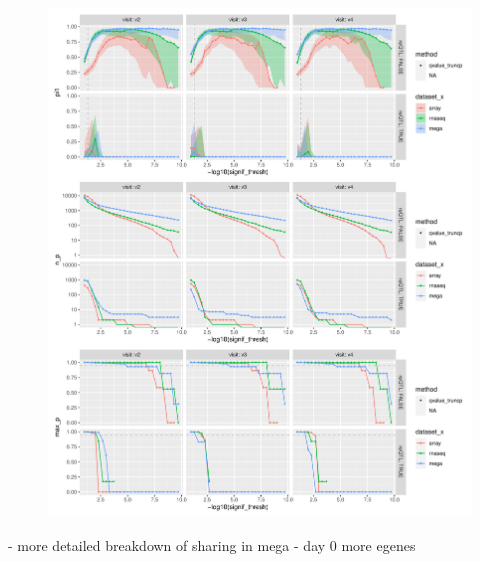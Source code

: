\begin{figure}
    \centering
    \includegraphics[width=1.0\textwidth,page=1]{mainmatter/figures/chapter_03/compute_pi1.pi1_by_thresholds.pdf}
    \caption{}
    \label{fig:hird_eQTL_pi1vsGTExWholeBlood}
\end{figure}

- more detailed breakdown of sharing in mega
- day 0 more egenes


